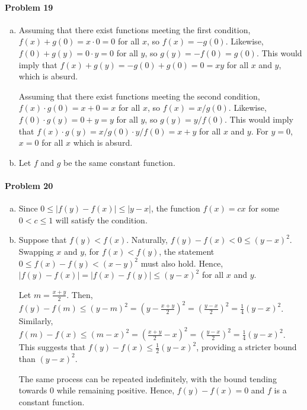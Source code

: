 \documentclass{article}
\begin{document}
\paragraph{Problem 19}
\begin{enumerate}[(a)]
  \item Assuming that there exist functions meeting the first
    condition, $f(x) + g(0) = x \cdot 0 = 0$ for all $x$, so $f(x) = -g(0)$.
    Likewise, $f(0) + g(y) = 0 \cdot y = 0$ for all $y$, so $g(y) = -f(0) =
    g(0)$. This would imply that $f(x) + g(y) = -g(0) + g(0) = 0 = xy$ for all
    $x$ and $y$, which is absurd.

    Assuming that there exist functions meeting the second condition, $f(x)
    \cdot g(0) = x + 0 = x$ for all $x$, so $f(x) = x/g(0)$. Likewise, $f(0)
    \cdot g(y) = 0 + y = y$ for all $y$, so $g(y) = y/f(0)$. This would imply
    that $f(x) \cdot g(y) = x/g(0) \cdot y/f(0) = x + y$ for all $x$ and $y$.
    For $y = 0$, $x = 0$ for all $x$ which is absurd.
  \item Let $f$ and $g$ be the same constant function.
\end{enumerate}

\paragraph{Problem 20}
\begin{enumerate}[(a)]
  \item Since $0 \leq |f(y) - f(x)| \leq |y - x|$, the function $f(x) = cx$ for
    some $0 < c \leq 1$ will satisfy the condition.
  \item Suppose that $f(y) < f(x)$. Naturally, $f(y) - f(x) < 0 \leq
    (y - x)^2$. Swapping $x$ and $y$, for $f(x) < f(y)$, the statement $0 \leq
    f(x) - f(y) < (x - y)^2$ must also hold. Hence, $|f(y) - f(x)| = |f(x) -
    f(y)| \leq (y - x)^2$ for all $x$ and $y$.

    Let $m = \frac{x + y}{2}$. Then, $f(y) - f(m) \leq (y - m)^2 = \left( y -
    \frac{x + y}{2} \right)^2 = \left( \frac{y - x}{2}\right)^2 = \frac{1}{4}
    (y - x)^2$. Similarly, $f(m) - f(x) \leq (m - x)^2 = \left( \frac{x + y}{2}
    - x \right)^2 = \left( \frac{y - x}{2} \right)^2 = \frac{1}{4}(y - x)^2$.
    This suggests that $f(y) - f(x) \leq \frac{1}{2}(y - x)^2$, providing a
    stricter bound than $(y - x)^2$.

    The same process can be repeated indefinitely, with the bound tending
    towards 0 while remaining positive. Hence, $f(y) - f(x) = 0$ and $f$ is a
    constant function.
\end{enumerate}
\end{document}
